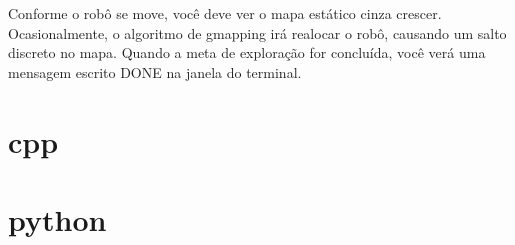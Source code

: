Conforme o robô se move, você deve ver o mapa estático cinza crescer. Ocasionalmente, o algoritmo de gmapping irá realocar o robô, causando um salto discreto no mapa. Quando a meta de exploração for concluída, você verá uma mensagem escrito DONE na janela do terminal.
\section{cpp}
\section{python}








